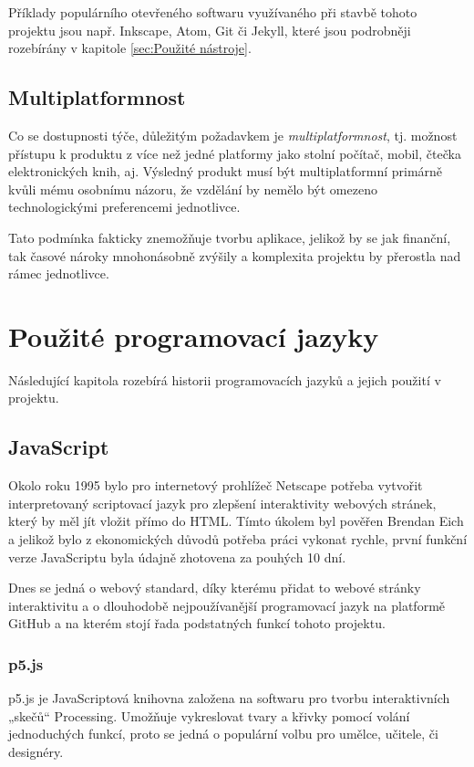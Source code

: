 \documentclass[a4paper, 12pt]{article}
\begin{document}
  Příklady populárního otevřeného softwaru využívaného při stavbě tohoto projektu jsou např. Inkscape, Atom, Git či Jekyll, které jsou podrobněji rozebírány v kapitole \ref{sec:Použité nástroje}.


  \subsection{Multiplatformnost}
  Co se dostupnosti týče, důležitým požadavkem je \emph{multiplatformnost}, tj. možnost přístupu k produktu z více než jedné platformy jako stolní počítač, mobil, čtečka elektronických knih, aj. Výsledný produkt musí být multiplatformní primárně kvůli mému osobnímu názoru, že vzdělání by nemělo být omezeno technologickými preferencemi jednotlivce.

  Tato podmínka fakticky znemožňuje tvorbu aplikace, jelikož by se jak finanční\cite{apple-store-membership,android-store-membership}, tak časové nároky mnohonásobně zvýšily a komplexita projektu by přerostla nad rámec jednotlivce.


  \section{Použité programovací jazyky}
  Následující kapitola rozebírá historii programovacích jazyků a jejich použití v projektu.


  \subsection{JavaScript}
  Okolo roku 1995 bylo pro internetový prohlížeč Netscape potřeba vytvořit interpretovaný scriptovací jazyk pro zlepšení interaktivity webových stránek, který by měl jít vložit přímo do HTML. Tímto úkolem byl pověřen Brendan Eich a jelikož bylo z ekonomických důvodů potřeba práci vykonat rychle, první funkční verze JavaScriptu byla údajně zhotovena za pouhých 10 dní\cite{the-origin-of-javascript}.

  Dnes se jedná o webový standard, díky kterému přidat to webové stránky interaktivitu a o dlouhodobě nejpoužívanější programovací jazyk na platformě GitHub\cite{github-statistics} a na kterém stojí řada podstatných funkcí tohoto projektu.


  \subsubsection{p5.js} \label{sec:p5.js}
  p5.js je JavaScriptová knihovna založena na softwaru pro tvorbu interaktivních „skečů“ Processing. Umožňuje vykreslovat tvary a křivky pomocí volání jednoduchých funkcí, proto se jedná o populární volbu pro umělce, učitele, či designéry.
\end{document}
